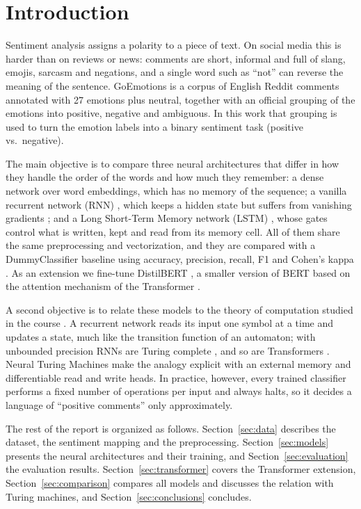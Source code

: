 \section{Introduction}
\label{sec:introduction}

Sentiment analysis assigns a polarity to a piece of text. On social media this is harder than
on reviews or news: comments are short, informal and full of slang, emojis, sarcasm and
negations, and a single word such as ``not'' can reverse the meaning of the sentence. GoEmotions
\cite{demszky2020goemotions} is a corpus of English Reddit comments annotated with 27 emotions
plus neutral, together with an official grouping of the emotions into positive, negative and
ambiguous. In this work that grouping is used to turn the emotion labels into a binary
sentiment task (positive vs.\ negative).

The main objective is to compare three neural architectures that differ in how they handle
the order of the words and how much they remember: a dense network over word embeddings, which
has no memory of the sequence; a vanilla recurrent network (RNN) \cite{elman1990finding}, which
keeps a hidden state but suffers from vanishing gradients \cite{bengio1994learning}; and a Long
Short-Term Memory network (LSTM) \cite{hochreiter1997long}, whose gates control what is
written, kept and read from its memory cell. All of them share the same preprocessing and
vectorization, and they are compared with a DummyClassifier baseline using accuracy, precision,
recall, F1 and Cohen's kappa \cite{cohen1960coefficient}. As an extension we fine-tune
DistilBERT \cite{sanh2019distilbert}, a smaller version of BERT \cite{devlin2019bert} based on
the attention mechanism of the Transformer \cite{vaswani2017attention}.

A second objective is to relate these models to the theory of computation studied in the
course \cite{sipser2013introduction}. A recurrent network reads its input one symbol at a time
and updates a state, much like the transition function of an automaton; with unbounded
precision RNNs are Turing complete \cite{siegelmann1995computational}, and so are Transformers
\cite{perez2021attention}. Neural Turing Machines \cite{graves2014neural} make the analogy
explicit with an external memory and differentiable read and write heads. In practice, however,
every trained classifier performs a fixed number of operations per input and always halts, so
it decides a language of ``positive comments'' only approximately.

The rest of the report is organized as follows. Section~\ref{sec:data} describes the dataset,
the sentiment mapping and the preprocessing. Section~\ref{sec:models} presents the neural
architectures and their training, and Section~\ref{sec:evaluation} the evaluation results.
Section~\ref{sec:transformer} covers the Transformer extension, Section~\ref{sec:comparison}
compares all models and discusses the relation with Turing machines, and
Section~\ref{sec:conclusions} concludes.

